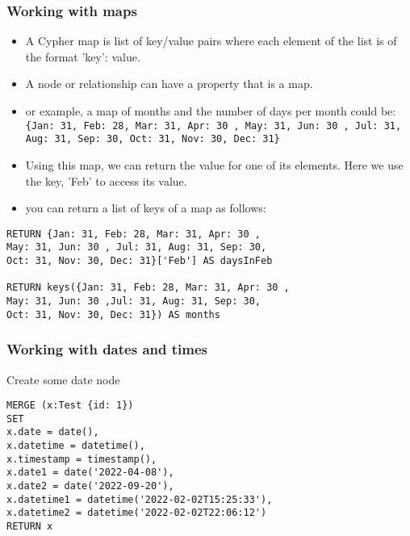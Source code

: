 \begin{frame}[fragile]\frametitle{Working with maps}

\begin{itemize}
\item A Cypher map is list of key/value pairs where each element of the list is of the format 'key': value. 
\item A node or relationship can have a property that is a map.
\item or example, a map of months and the number of days per month could be: \lstinline|{Jan: 31, Feb: 28, Mar: 31, Apr: 30 , May: 31, Jun: 30 , Jul: 31, Aug: 31, Sep: 30, Oct: 31, Nov: 30, Dec: 31}|
\item Using this map, we can return the value for one of its elements. Here we use the key, 'Feb' to access its value.

\item you can return a list of keys of a map as follows:
\end{itemize}

\begin{lstlisting}
RETURN {Jan: 31, Feb: 28, Mar: 31, Apr: 30 ,
May: 31, Jun: 30 , Jul: 31, Aug: 31, Sep: 30,
Oct: 31, Nov: 30, Dec: 31}['Feb'] AS daysInFeb

RETURN keys({Jan: 31, Feb: 28, Mar: 31, Apr: 30 ,
May: 31, Jun: 30 ,Jul: 31, Aug: 31, Sep: 30,
Oct: 31, Nov: 30, Dec: 31}) AS months
\end{lstlisting}


\end{frame}

\begin{frame}[fragile]\frametitle{Working with dates and times}

Create some date node

\begin{lstlisting}
MERGE (x:Test {id: 1})
SET
x.date = date(),
x.datetime = datetime(),
x.timestamp = timestamp(),
x.date1 = date('2022-04-08'),
x.date2 = date('2022-09-20'),
x.datetime1 = datetime('2022-02-02T15:25:33'),
x.datetime2 = datetime('2022-02-02T22:06:12')
RETURN x
\end{lstlisting}


\end{frame}

